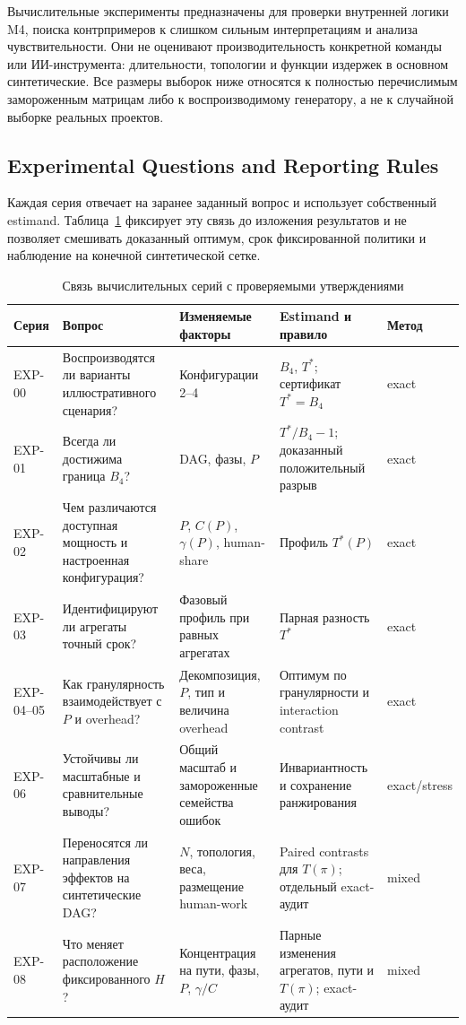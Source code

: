 \label{sec:computational-method}

Вычислительные эксперименты предназначены для проверки внутренней логики M4,
поиска контрпримеров к слишком сильным интерпретациям и анализа
чувствительности. Они не оценивают производительность конкретной команды или
ИИ-инструмента: длительности, топологии и функции издержек в основном
синтетические. Все размеры выборок ниже относятся к полностью перечислимым
замороженным матрицам либо к воспроизводимому генератору, а не к случайной
выборке реальных проектов.

\subsection{Experimental Questions and Reporting Rules}

Каждая серия отвечает на заранее заданный вопрос и использует собственный
estimand. Таблица~\ref{tab:experiment-design} фиксирует эту связь до изложения
результатов и не позволяет смешивать доказанный оптимум, срок фиксированной
политики и наблюдение на конечной синтетической сетке.

\begin{table}[ht]
\centering
\scriptsize
\caption{Связь вычислительных серий с проверяемыми утверждениями}
\label{tab:experiment-design}
\begin{tabularx}{\textwidth}{@{}l>{\raggedright\arraybackslash}X>{\raggedright\arraybackslash}X>{\raggedright\arraybackslash}Xl@{}}
\toprule
Серия & Вопрос & Изменяемые факторы & Estimand и правило & Метод \\
\midrule
EXP-00 & Воспроизводятся ли варианты иллюстративного сценария? & Конфигурации 2--4 & $B_4$, $T^*$; сертификат $T^*=B_4$ & exact \\
EXP-01 & Всегда ли достижима граница $B_4$? & DAG, фазы, $P$ & $T^*/B_4-1$; доказанный положительный разрыв & exact \\
EXP-02 & Чем различаются доступная мощность и настроенная конфигурация? & $P$, $C(P)$, $\gamma(P)$, human-share & Профиль $T^*(P)$ & exact \\
EXP-03 & Идентифицируют ли агрегаты точный срок? & Фазовый профиль при равных агрегатах & Парная разность $T^*$ & exact \\
EXP-04--05 & Как гранулярность взаимодействует с $P$ и overhead? & Декомпозиция, $P$, тип и величина overhead & Оптимум по гранулярности и interaction contrast & exact \\
EXP-06 & Устойчивы ли масштабные и сравнительные выводы? & Общий масштаб и замороженные семейства ошибок & Инвариантность и сохранение ранжирования & exact/stress \\
EXP-07 & Переносятся ли направления эффектов на синтетические DAG? & $N$, топология, веса, размещение human-work & Paired contrasts для $T(\pi)$; отдельный exact-аудит & mixed \\
EXP-08 & Что меняет расположение фиксированного $H$? & Концентрация на пути, фазы, $P$, $\gamma/C$ & Парные изменения агрегатов, пути и $T(\pi)$; exact-аудит & mixed \\
\bottomrule
\end{tabularx}
\end{table}


